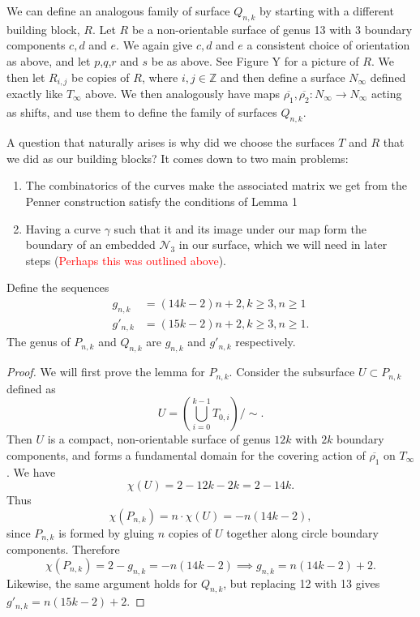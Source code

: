 We can define an analogous family of surface $Q_{n,k}$ by starting with a different building block, $R$. Let $R$ be a non-orientable surface of genus 13 with 3 boundary components $c,d$ and $e$. We again give $c, d$ and $e$ a consistent choice of orientation as above, and let $p$,$q$,$r$ and $s$ be as above. See Figure Y for a picture of $R$. We then let $R_{i,j}$ be copies of $R$, where $i,j \in \mathbb{Z}$ and then define a surface $N_\infty$ defined exactly like $T_\infty$ above. We then analogously have maps $\overline{\rho_1},\overline{\rho_2}: N_\infty \xrightarrow[]{} N_\infty$ acting as shifts, and use them to define the family of surfaces $Q_{n,k}$.

A question that naturally arises is why did we choose the surfaces $T$ and $R$ that we did as our building blocks? It comes down to two main problems:
\begin{enumerate}
    \item The combinatorics of the curves make the associated matrix we get from the Penner construction satisfy the conditions of Lemma 1 
    \item Having a curve $\gamma$ such that it and its image under our map form the boundary of an embedded $\mathcal{N}_3$ in our surface, which we will need in later steps (\textcolor{red}{Perhaps this was outlined above}). 
\end{enumerate}

\begin{lem}
Define the sequences
\begin{align}
    g_{n,k} &= (14k - 2)n + 2, k \geq 3, n \geq 1 \\
    g'_{n,k} &= (15k - 2)n + 2, k \geq 3, n \geq 1.
\end{align}
    The genus of $P_{n,k}$ and $Q_{n,k}$ are $g_{n,k}$ and $g'_{n,k}$ respectively.
\end{lem}
\begin{proof}
    We will first prove the lemma for $P_{n,k}$. Consider the subsurface $U \subset P_{n,k}$ defined as $$U = \left( \bigcup_{i =0}^{k-1} T_{0,i} \right)/\sim.$$ Then $U$ is a compact, non-orientable surface of genus $12k$ with $2k$ boundary components, and forms a fundamental domain for the covering action of $\overline{\rho_1}$ on $T_\infty$. We have $$\chi(U) = 2 - 12k - 2k = 2 - 14k.$$ Thus $$\chi(P_{n,k}) = n \cdot \chi(U) = -n(14k - 2),$$ since $P_{n,k}$ is formed by gluing $n$ copies of $U$ together along circle boundary components. Therefore $$\chi(P_{n,k}) = 2 - g_{n,k} = -n(14k - 2) \implies g_{n,k} = n(14k - 2) + 2.$$ Likewise, the same argument holds for $Q_{n,k}$, but replacing 12 with 13 gives $g'_{n,k} = n(15k - 2) + 2$.
\end{proof}

